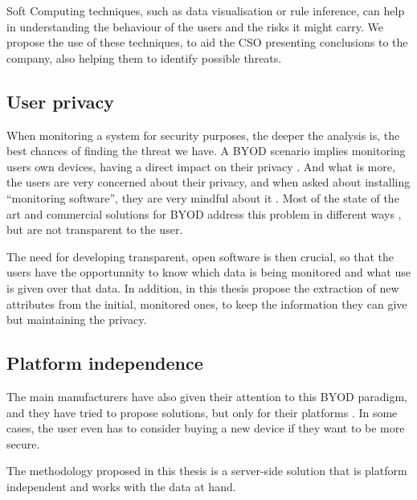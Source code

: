 Soft Computing techniques, such as data visualisation or rule inference, can help in understanding the behaviour of the users and the risks it might carry. We propose the use of these techniques,  %
 to aid the CSO presenting conclusions to the company, also helping them to identify possible threats.

\subsection{User privacy}
\label{subsec:user_priv}

When monitoring a system for security purposes, the deeper the analysis is, the best chances of finding the threat we have. A BYOD scenario implies monitoring users own devices, having a direct impact on their privacy \cite{Miller12Privacy}. And what is more, the users are very concerned about their privacy, and when asked about installing ``monitoring software'', they are very mindful about it \cite{Miller12Privacy, ali2015analysis}. Most of the state of the art and commercial solutions for BYOD address this problem in different ways \cite{de2015corporate}, but are not transparent to the user.

The need for developing transparent, open software is then crucial, so that the users have the opportunnity to know which data is being monitored and what use is given over that data. In addition, in this thesis propose the extraction of new attributes from the initial, monitored ones, to keep the information they can give but maintaining the privacy.

\subsection{Platform independence}
\label{subsec:platf_ind}

The main manufacturers have also given their attention to this BYOD paradigm, and they have tried to propose solutions, but only for their platforms \cite{de2015corporate}. In some cases, the user even has to consider buying a new device if they want to be more secure.

The methodology proposed in this thesis is a server-side solution that is platform independent and works with the data at hand. %

